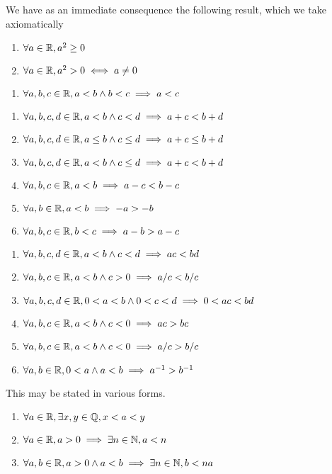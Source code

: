 \M
We have as an immediate consequence the following result, which we take axiomatically
\begin{enumerate}[resume*]
\item $\forall a\in\mathbb{R}, a^{2}\geq0$
\item $\forall a\in\mathbb{R}, a^{2}>0\iff a\neq0$
\end{enumerate}

\begin{enumerate}[resume*]
\item $\forall a,b,c\in\mathbb{R},a<b\land b<c\implies a<c$
\end{enumerate}

\begin{enumerate}[resume*]
\item $\forall a,b,c,d\in\mathbb{R}, a<b\land c<d\implies a+c<b+d$
\item $\forall a,b,c,d\in\mathbb{R}, a\leq b\land c\leq d\implies a+c\leq b+d$
\item $\forall a,b,c,d\in\mathbb{R}, a<b\land c\leq d\implies a+c< b+d$
\item $\forall a,b,c\in\mathbb{R}, a<b\implies a-c < b-c$
\item $\forall a,b\in\mathbb{R}, a<b\implies -a > -b$
\item $\forall a,b,c\in\mathbb{R}, b<c\implies a-b > a-c$
\end{enumerate}

\begin{enumerate}[resume*]
\item $\forall a,b,c,d\in\mathbb{R}, a<b\land c<d\implies ac<bd$
\item $\forall a,b,c\in\mathbb{R}, a<b\land c>0\implies a/c<b/c$
\item $\forall a,b,c,d\in\mathbb{R}, 0<a<b\land 0<c<d\implies 0<ac<bd$
\item $\forall a,b,c\in\mathbb{R}, a<b\land c<0\implies ac>bc$
\item $\forall a,b,c\in\mathbb{R}, a<b\land c<0\implies a/c>b/c$
\item $\forall a,b\in\mathbb{R}, 0<a\land a<b\implies a^{-1} > b^{-1}$
\end{enumerate}

 This may be stated in various forms.
\begin{enumerate}[resume*]
\item $\forall a\in\mathbb{R},\exists x,y\in\mathbb{Q}, x < a < y$
\item $\forall a\in\mathbb{R}, a>0\implies \exists n\in\mathbb{N}, a < n$
\item $\forall a,b\in\mathbb{R}, a>0\land a < b\implies \exists n\in\mathbb{N}, b < na$
\end{enumerate}

